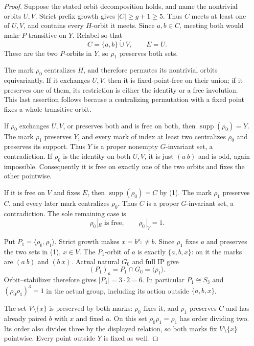 \documentclass[11pt,a4paper]{article}
\newcommand{\gen}[1]{\langle#1\rangle}
\begin{document}
\begin{proof}
Suppose the stated orbit decomposition holds, and name the
nontrivial orbits $U,V$. Strict prefix growth gives
$|C|\ge g+1\ge5$. Thus $C$ meets at least one of $U,V$,
and contains every $H$-orbit it meets. Since $a,b\in C$,
meeting both would make $P$ transitive on $Y$.
Relabel so that
\[
                  C=\{a,b\}\mathbin{\dot\cup}V,
                       \qquad E=U.                       \tag{1}
\]
These are the two $P$-orbits in $Y$, so $\rho_1$ preserves
both sets.

The mark $\rho_0$ centralizes $H$, and therefore permutes
its nontrivial orbits equivariantly. If it exchanges $U,V$,
then it is fixed-point-free on their union; if it preserves
one of them, its restriction is either the identity or a free
involution. This last assertion follows because a centralizing
permutation with a fixed point fixes a whole transitive orbit.

If $\rho_0$ exchanges $U,V$, or preserves both and is free
on both, then $\operatorname{supp}(\rho_0)=Y$.
The mark $\rho_1$ preserves $Y$, and every mark of index at
least two centralizes $\rho_0$ and preserves its support.
Thus $Y$ is a proper nonempty $G$-invariant set, a contradiction.
If $\rho_0$ is the identity on both $U,V$, it is just
$(a\ b)$ and is odd, again impossible. Consequently it is
free on exactly one of the two orbits and fixes the other
pointwise.

If it is free on $V$ and fixes $E$, then
$\operatorname{supp}(\rho_0)=C$ by (1).
The mark $\rho_1$ preserves $C$, and every later mark
centralizes $\rho_0$. Thus $C$ is a proper $G$-invariant set,
a contradiction. The sole remaining case is
\[
 \rho_0|_E\text{ is free},\qquad \rho_0|_V=1.             \tag{2}
\]

Put $P_1=\gen{\rho_0,\rho_1}$. Strict growth makes
$x=b^{\rho_1}\ne b$. Since $\rho_1$ fixes $a$ and
preserves the two sets in (1), $x\in V$.
The $P_1$-orbit of $a$ is exactly $\{a,b,x\}$:
on it the marks are $(a\ b)$ and $(b\ x)$.
Actual natural $G_0$ and full IP give
\[
       (P_1)_a=P_1\cap G_0=\gen{\rho_1}.
\]
Orbit--stabilizer therefore gives $|P_1|=3\cdot2=6$.
In particular $P_1\cong S_3$ and
$(\rho_0\rho_1)^3=1$ in the actual group, including
its action outside $\{a,b,x\}$.

The set $V\setminus\{x\}$ is preserved by both marks:
$\rho_0$ fixes it, and $\rho_1$ preserves $C$ and has
already paired $b$ with $x$ and fixed $a$.
On this set $\rho_0\rho_1=\rho_1$ has order dividing
two. Its order also divides three by the displayed relation,
so both marks fix $V\setminus\{x\}$ pointwise.
Every point outside $Y$ is fixed as well.


\end{proof}
\end{document}
